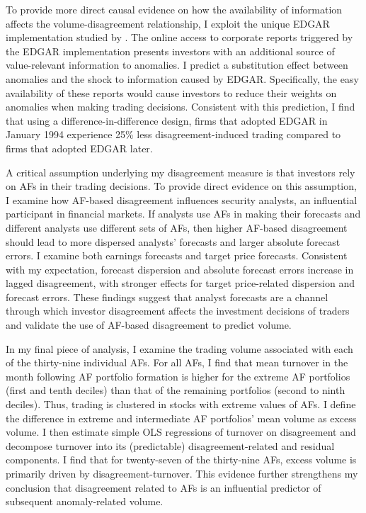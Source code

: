 \documentclass[
  12pt,
  a4paper,
  twoside,
  onecolumn]{article}
\begin{document}
To provide more direct causal evidence on how the availability of
information affects the volume-disagreement relationship, I exploit the
unique EDGAR implementation studied by \cite{chang_2020}. The online
access to corporate reports triggered by the EDGAR implementation
presents investors with an additional source of value-relevant
information to anomalies. I predict a substitution effect between
anomalies and the shock to information caused by EDGAR. Specifically,
the easy availability of these reports would cause investors to reduce
their weights on anomalies when making trading decisions. Consistent
with this prediction, I find that using a difference-in-difference
design, firms that adopted EDGAR in January 1994 experience 25\% less
disagreement-induced trading compared to firms that adopted EDGAR later.

A critical assumption underlying my disagreement measure is that
investors rely on AFs in their trading decisions. To provide direct
evidence on this assumption, I examine how AF-based disagreement
influences security analysts, an influential participant in financial
markets. If analysts use AFs in making their forecasts and different
analysts use different sets of AFs, then higher AF-based disagreement
should lead to more dispersed analysts' forecasts and larger absolute
forecast errors. I examine both earnings forecasts and target price
forecasts. Consistent with my expectation, forecast dispersion and
absolute forecast errors increase in lagged disagreement, with stronger
effects for target price-related dispersion and forecast errors. These
findings suggest that analyst forecasts are a channel through which
investor disagreement affects the investment decisions of traders and
validate the use of AF-based disagreement to predict volume.

In my final piece of analysis, I examine the trading volume associated
with each of the thirty-nine individual AFs. For all AFs, I find that
mean turnover in the month following AF portfolio formation is higher
for the extreme AF portfolios (first and tenth deciles) than that of the
remaining portfolios (second to ninth deciles). Thus, trading is
clustered in stocks with extreme values of AFs. I define the difference
in extreme and intermediate AF portfolios' mean volume as excess volume.
I then estimate simple OLS regressions of turnover on disagreement and
decompose turnover into its (predictable) disagreement-related and
residual components. I find that for twenty-seven of the thirty-nine
AFs, excess volume is primarily driven by disagreement-turnover. This
evidence further strengthens my conclusion that disagreement related to
AFs is an influential predictor of subsequent anomaly-related volume.
\end{document}
